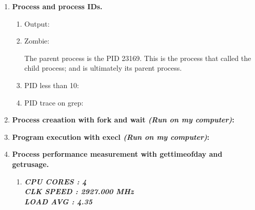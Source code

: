 \documentclass{article}
\begin{document}
\lstset{language=[ANSI]C}

\begin{enumerate}
	\item \textbf{Process and process IDs.}
	\begin{enumerate}
	\item Output:\\
		
	\item Zombie:\\
		
		\raggedright{The parent process is the PID 23169. This is the process that
					called the child process; and is ultimately its parent process.}
	\item PID less than 10: \\
		
	\item PID trace on grep: \\
		
	\end{enumerate}
	\item \textbf{Process creaation with fork and wait \emph{(Run on my computer)}: \\}
		
		
	\item \textbf{Program execution with execl \emph{(Run on my computer)}: \\}
		
		
	\item \textbf{Process performance measurement with gettimeofday and getrusage. }
	\begin{enumerate}
	\item \textbf{\emph{CPU CORES : 4 \\ CLK SPEED : 2927.000 MHz \\ LOAD AVG : 4.35}}
	

\end{enumerate}
\end{enumerate}
\end{document}
